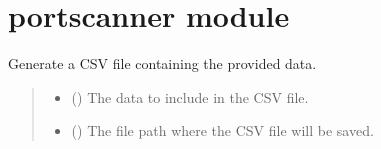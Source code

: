 \documentclass[letterpaper,10pt,english]{sphinxmanual}
\begin{document}
\sphinxstepscope


\section{portscanner module}
\label{\detokenize{portscanner:module-portscanner}}\label{\detokenize{portscanner:portscanner-module}}\label{\detokenize{portscanner::doc}}

\begin{fulllineitems}
\label{\detokenize{portscanner:portscanner.generate_csv}}
\pysigstartsignatures
{}
\pysigstopsignatures
\sphinxAtStartPar
Generate a CSV file containing the provided data.
\begin{quote}\begin{description}
\begin{itemize}
\item {} 
\sphinxAtStartPar
{} (\sphinxstyleliteralemphasis{\sphinxupquote{{[}}}\sphinxstyleliteralemphasis{\sphinxupquote{{[}}}\sphinxstyleliteralemphasis{\sphinxupquote{{]}}}\sphinxstyleliteralemphasis{\sphinxupquote{{]}}}) \textendash{} The data to include in the CSV file.

\item {} 
\sphinxAtStartPar
{} () \textendash{} The file path where the CSV file will be saved.

\end{itemize}

\end{description}\end{quote}

\end{fulllineitems}

\end{document}
